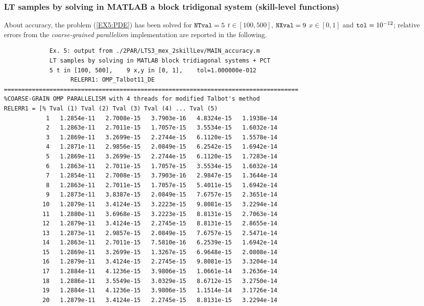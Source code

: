 \documentclass[a4paper,10pt]{report}%
\begin{document}
\subsubsection{LT samples by solving in MATLAB a block tridigonal system (skill-level functions)}
About accuracy, the problem (\ref{EX5:PDE}) has been solved for ${\tt NTval}=5$ $t\in[100, 500]$,
${\tt NXval}=9$ $x\in[0,1]$ and ${\tt tol}=10^{-12}$; relative errors from the {\em coarse-grained
parallelism} implementation are reported in the following.
\begin{lstlisting}
             Ex. 5: output from ./2PAR/LTS3_mex_2skillLev/MAIN_accuracy.m
             LT samples by solving in MATLAB block tridiagonal systems + PCT
             5 t in [100, 500],    9 x,y in [0, 1],    tol=1.000000e-012
                   RELERR1: OMP_Talbot11_DE
====================================================================================
%COARSE-GRAIN OMP PARALLELISM with 4 threads for modified Talbot's method
RELERR1 = [% Tval (1) Tval (2) Tval (3) Tval (4) ... Tval (5)
            1   1.2854e-11   2.7008e-15   3.7903e-16   4.8324e-15   1.1938e-14
            2   1.2863e-11   2.7011e-15   1.7057e-15   3.5534e-15   1.6032e-14
            3   1.2869e-11   3.2699e-15   2.2744e-15   6.1120e-15   1.5578e-14
            4   1.2871e-11   2.9856e-15   2.0849e-15   6.2542e-15   1.6942e-14
            5   1.2869e-11   3.2699e-15   2.2744e-15   6.1120e-15   1.7283e-14
            6   1.2863e-11   2.7011e-15   1.7057e-15   3.5534e-15   1.6032e-14
            7   1.2854e-11   2.7008e-15   3.7903e-16   2.9847e-15   1.3644e-14
            8   1.2863e-11   2.7011e-15   1.7057e-15   5.4011e-15   1.6942e-14
            9   1.2873e-11   3.8387e-15   2.0849e-15   7.6757e-15   2.3651e-14
           10   1.2879e-11   3.4124e-15   3.2223e-15   9.8081e-15   3.2294e-14
           11   1.2880e-11   3.6968e-15   3.2223e-15   8.8131e-15   2.7063e-14
           12   1.2879e-11   3.4124e-15   2.2745e-15   8.8131e-15   2.8655e-14
           13   1.2873e-11   2.9857e-15   2.0849e-15   7.6757e-15   2.5471e-14
           14   1.2863e-11   2.7011e-15   7.5810e-16   6.2539e-15   1.6942e-14
           15   1.2869e-11   3.2699e-15   1.3267e-15   6.9648e-15   2.0808e-14
           16   1.2879e-11   3.4124e-15   2.2745e-15   9.8081e-15   3.3204e-14
           17   1.2884e-11   4.1236e-15   3.9806e-15   1.0661e-14   3.2636e-14
           18   1.2886e-11   3.5549e-15   3.0329e-15   8.6712e-15   3.2750e-14
           19   1.2884e-11   4.1236e-15   3.9806e-15   1.1514e-14   3.1726e-14
           20   1.2879e-11   3.4124e-15   2.2745e-15   8.8131e-15   3.2294e-14

\end{lstlisting}
\end{document}
